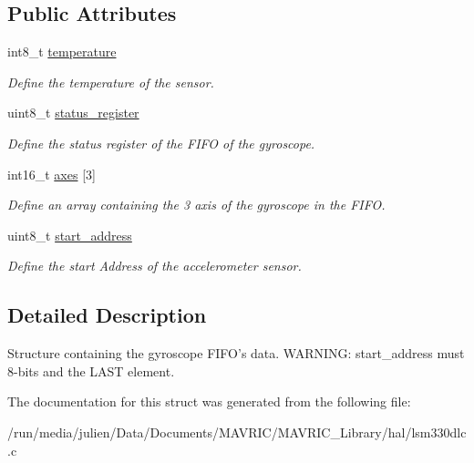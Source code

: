 \subsection*{Public Attributes}
\begin{DoxyCompactItemize}
\item 
\hypertarget{structlsm__gyro__read__t_ab4fedcc1a97aaa4f46849964eeec6397}{int8\+\_\+t \hyperlink{structlsm__gyro__read__t_ab4fedcc1a97aaa4f46849964eeec6397}{temperature}}\label{structlsm__gyro__read__t_ab4fedcc1a97aaa4f46849964eeec6397}

\begin{DoxyCompactList}\small\item\em Define the temperature of the sensor. \end{DoxyCompactList}\item 
\hypertarget{structlsm__gyro__read__t_ae71d35834f66b492410af27faf119da2}{uint8\+\_\+t \hyperlink{structlsm__gyro__read__t_ae71d35834f66b492410af27faf119da2}{status\+\_\+register}}\label{structlsm__gyro__read__t_ae71d35834f66b492410af27faf119da2}

\begin{DoxyCompactList}\small\item\em Define the status register of the F\+I\+F\+O of the gyroscope. \end{DoxyCompactList}\item 
\hypertarget{structlsm__gyro__read__t_a26186767ed29a9dfd5babbfee6e237aa}{int16\+\_\+t \hyperlink{structlsm__gyro__read__t_a26186767ed29a9dfd5babbfee6e237aa}{axes} \mbox{[}3\mbox{]}}\label{structlsm__gyro__read__t_a26186767ed29a9dfd5babbfee6e237aa}

\begin{DoxyCompactList}\small\item\em Define an array containing the 3 axis of the gyroscope in the F\+I\+F\+O. \end{DoxyCompactList}\item 
\hypertarget{structlsm__gyro__read__t_a3f1d842d2091666e04ecfeda461f3470}{uint8\+\_\+t \hyperlink{structlsm__gyro__read__t_a3f1d842d2091666e04ecfeda461f3470}{start\+\_\+address}}\label{structlsm__gyro__read__t_a3f1d842d2091666e04ecfeda461f3470}

\begin{DoxyCompactList}\small\item\em Define the start Address of the accelerometer sensor. \end{DoxyCompactList}\end{DoxyCompactItemize}


\subsection{Detailed Description}
Structure containing the gyroscope F\+I\+F\+O's data. W\+A\+R\+N\+I\+N\+G\+: start\+\_\+address must 8-\/bits and the L\+A\+S\+T element. 

The documentation for this struct was generated from the following file\+:\begin{DoxyCompactItemize}
\item 
/run/media/julien/\+Data/\+Documents/\+M\+A\+V\+R\+I\+C/\+M\+A\+V\+R\+I\+C\+\_\+\+Library/hal/lsm330dlc.\+c\end{DoxyCompactItemize}
